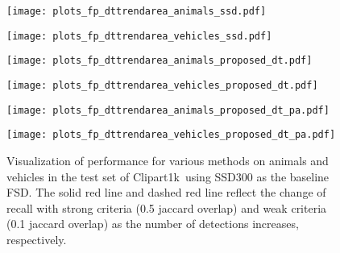 \documentclass[10pt,twocolumn,letterpaper]{article}
\newcommand{\datasetclipart}{Clipart1k}
\begin{document}
\begin{figure}[t]
{\captionsetup[subfigure]{justification=centering}
	\begin{minipage}[t]{0.49\linewidth}
		\centering
  		\texttt{[image: plots\_fp\_dttrendarea\_animals\_ssd.pdf]}
	\end{minipage}
	\begin{minipage}[t]{0.49\linewidth}
		\texttt{[image: plots\_fp\_dttrendarea\_vehicles\_ssd.pdf]}
	\end{minipage}
	\begin{minipage}[t]{0.49\linewidth}
  		\centering
  		\texttt{[image: plots\_fp\_dttrendarea\_animals\_proposed\_dt.pdf]}
  	\end{minipage}
	\begin{minipage}[t]{0.49\linewidth}
 		\texttt{[image: plots\_fp\_dttrendarea\_vehicles\_proposed\_dt.pdf]}
 	\end{minipage}
	\begin{minipage}[t]{0.49\linewidth}
		\centering
  		\texttt{[image: plots\_fp\_dttrendarea\_animals\_proposed\_dt\_pa.pdf]}
  	\end{minipage}
  	\begin{minipage}[t]{0.49\linewidth}
  		\centering
  		\texttt{[image: plots\_fp\_dttrendarea\_vehicles\_proposed\_dt\_pa.pdf]}
  	\end{minipage}
}
\caption{Visualization of performance for various methods on animals and vehicles in the test set of \datasetclipart~using SSD300 as the baseline FSD.
 The solid red line and dashed red line reflect the change of recall with strong criteria (0.5 jaccard overlap) and weak criteria (0.1 jaccard overlap) as the number of detections increases, respectively.
}
\label{fig:visualization_of_performance}
\end{figure}
\end{document}
